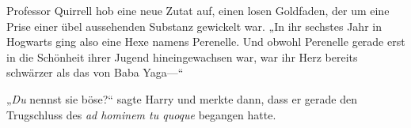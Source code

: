 Professor Quirrell hob eine neue Zutat auf, einen losen Goldfaden, der um eine Prise einer übel aussehenden Substanz gewickelt war.
„In ihr sechstes Jahr in Hogwarts ging also eine Hexe namens Perenelle. Und obwohl Perenelle gerade erst in die Schönheit ihrer Jugend hineingewachsen war, war ihr Herz bereits schwärzer als das von Baba Yaga—“

„\emph{Du} nennst sie böse?“ sagte Harry und merkte dann, dass er gerade den Trugschluss des \emph{ad hominem tu quoque} begangen hatte.

